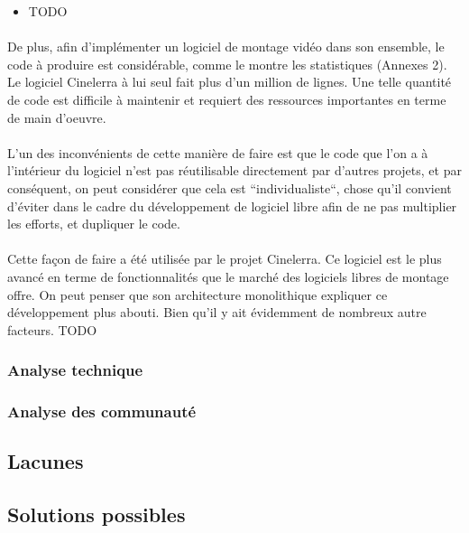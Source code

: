 \begin{itemize}
  \item{TODO}
\end{itemize}

\paragraph{} De plus, afin d'implémenter un logiciel de montage vidéo
dans son ensemble, le code à produire est considérable, comme
le montre les statistiques (Annexes 2). Le logiciel Cinelerra à lui
seul fait plus d'un million de lignes. Une telle quantité de code est
difficile à maintenir et requiert des ressources importantes en terme
de main d'oeuvre.

\paragraph{} L'un des inconvénients de cette manière de faire est que
le code que l'on a à l'intérieur du logiciel n'est pas réutilisable
directement par d'autres projets, et par conséquent, on peut considérer
que cela est ``individualiste``, chose qu'il convient d'éviter dans le
cadre du développement de logiciel libre afin de ne pas multiplier les
efforts, et dupliquer le code.

\paragraph{} Cette façon de faire a été utilisée par le projet
Cinelerra. Ce logiciel est le plus avancé en terme de fonctionnalités
que le marché des logiciels libres de montage offre. On peut
penser que son architecture monolithique expliquer ce développement
plus abouti. Bien qu'il y ait évidemment de nombreux autre facteurs. TODO


\subsubsection{Analyse technique}

\subsubsection{Analyse des communauté}

\subsection{Lacunes}

\subsection{Solutions possibles}

